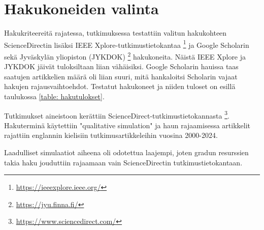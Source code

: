 \documentclass[utf8]{gradu3}
\begin{document}
\section{Hakukoneiden valinta} \label{hakukoneiden valinta}
Hakukriteereitä rajatessa, tutkimuksessa testattiin valitun hakukohteen ScienceDirectin lisäksi IEEE Xplore-tutkimustietokantaa 
\footnote{\url{https://ieeexplore.ieee.org/}} ja Google Scholarin 
sekä Jyväskylän yliopiston (JYKDOK) \footnote{\url{https://jyu.finna.fi/}} hakukoneita. Näistä IEEE Xplore ja JYKDOK jäivät tuloksiltaan liian vähäisiksi.
Google Scholarin hauissa taas saatujen artikkelien määrä oli liian suuri, 
mitä hankaloitsi Scholarin vajaat hakujen rajausvaihtoehdot. 
Testatut hakukoneet ja niiden tuloset on esillä taulukossa \ref{table: hakutulokset}.

Tutkimukset aineistoon kerättiin ScienceDirect-tutkimustietokannasta \footnote{\url{https://www.sciencedirect.com/}}. Hakuterminä käytettiin "qualitative simulation" ja haun rajaamisessa artikkelit rajattiin englannin kielisiin tutkimusartikkeleihin vuosina 2000-2024. 

\begin{table}[h]
\centering
{}
\caption{Hakutulosten määrä hakukohteista}
\label{table: hakutulokset}
\end{table}

Laadulliset simulaatiot aiheena oli odotettua laajempi, 
joten gradun resurssien takia haku jouduttiin rajaamaan 
vain ScienceDirectin tutkimustietokantaan.
\end{document}

